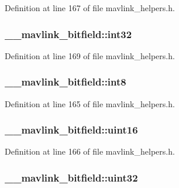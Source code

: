Definition at line 167 of file mavlink\-\_\-helpers.\-h.

\hypertarget{union____mavlink__bitfield_a07bd702e8b91679a25e632ad90d0a1ec}{
\subsubsection[{int32}]{ \-\_\-\-\_\-mavlink\-\_\-bitfield\-::int32}}\label{union____mavlink__bitfield_a07bd702e8b91679a25e632ad90d0a1ec}


Definition at line 169 of file mavlink\-\_\-helpers.\-h.

\hypertarget{union____mavlink__bitfield_a50a846d427d7a1d7dc79235c87597622}{
\subsubsection[{int8}]{ \-\_\-\-\_\-mavlink\-\_\-bitfield\-::int8}}\label{union____mavlink__bitfield_a50a846d427d7a1d7dc79235c87597622}


Definition at line 165 of file mavlink\-\_\-helpers.\-h.

\hypertarget{union____mavlink__bitfield_a0ca76ce4a09ee26387e50b6702c17894}{
\subsubsection[{uint16}]{ \-\_\-\-\_\-mavlink\-\_\-bitfield\-::uint16}}\label{union____mavlink__bitfield_a0ca76ce4a09ee26387e50b6702c17894}


Definition at line 166 of file mavlink\-\_\-helpers.\-h.

\hypertarget{union____mavlink__bitfield_ab43ed56310c2d778ebaa7a5a21cb6587}{
\subsubsection[{uint32}]{ \-\_\-\-\_\-mavlink\-\_\-bitfield\-::uint32}}\label{union____mavlink__bitfield_ab43ed56310c2d778ebaa7a5a21cb6587}


